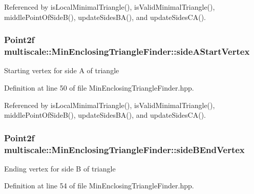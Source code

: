 Referenced by is\-Local\-Minimal\-Triangle(), is\-Valid\-Minimal\-Triangle(), middle\-Point\-Of\-Side\-B(), update\-Sides\-B\-A(), and update\-Sides\-C\-A().

\hypertarget{classmultiscale_1_1MinEnclosingTriangleFinder_a2e9e3f20e0c0d8bcf34e8ce903aabb42}{
\subsubsection[{side\-A\-Start\-Vertex}]{\setlength{\rightskip}{0pt plus 5cm}Point2f multiscale\-::\-Min\-Enclosing\-Triangle\-Finder\-::side\-A\-Start\-Vertex\hspace{0.3cm}{\ttfamily [private]}}}\label{classmultiscale_1_1MinEnclosingTriangleFinder_a2e9e3f20e0c0d8bcf34e8ce903aabb42}
Starting vertex for side A of triangle 

Definition at line 50 of file Min\-Enclosing\-Triangle\-Finder.\-hpp.



Referenced by is\-Local\-Minimal\-Triangle(), is\-Valid\-Minimal\-Triangle(), middle\-Point\-Of\-Side\-B(), update\-Sides\-B\-A(), and update\-Sides\-C\-A().

\hypertarget{classmultiscale_1_1MinEnclosingTriangleFinder_a8e3929795823c49572ff65a4f04462c6}{
\subsubsection[{side\-B\-End\-Vertex}]{\setlength{\rightskip}{0pt plus 5cm}Point2f multiscale\-::\-Min\-Enclosing\-Triangle\-Finder\-::side\-B\-End\-Vertex\hspace{0.3cm}{\ttfamily [private]}}}\label{classmultiscale_1_1MinEnclosingTriangleFinder_a8e3929795823c49572ff65a4f04462c6}
Ending vertex for side B of triangle 

Definition at line 54 of file Min\-Enclosing\-Triangle\-Finder.\-hpp.



